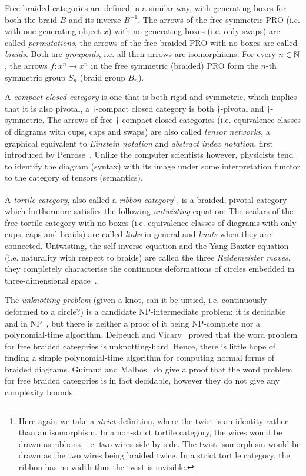 Free braided categories are defined in a similar way, with generating boxes for both the braid $B$ and its inverse $B^{-1}$.
The arrows of the free symmetric PRO (i.e. with one generating object $x$) with no generating boxes (i.e. only swaps) are called \emph{permutations}, the arrows of the free braided PRO with no boxes are called \emph{braids}.
Both are \emph{groupoids}, i.e. all their arrows are isomorphisms.
For every $n \in \mathbb{N}$, the arrows $f : x^n \to x^n$ in the free symmetric (braided) PRO form the $n$-th symmetric group $S_n$ (braid group $B_n$).

A \emph{compact closed category} is one that is both rigid and symmetric, which implies that it is also pivotal, a $\dagger$-compact closed category is both $\dagger$-pivotal and $\dagger$-symmetric.
The arrows of free $\dagger$-compact closed categories (i.e. equivalence classes of diagrams with cups, caps and swaps) are also called \emph{tensor networks}, a graphical equivalent to \emph{Einstein notation} and \emph{abstract index notation}, first introduced by Penrose~\cite{Penrose71}.
Unlike the computer scientists however, physicists tend to identify the diagram (syntax) with its image under some interpretation functor to the category of tensors (semantics).

A \emph{tortile category}, also called a \emph{ribbon category}\footnote
{Here again we take a \emph{strict} definition, where the twist is an identity rather than an isomorphism.
In a non-strict tortile category, the wires would be drawn as ribbons, i.e. two wires side by side.
The twist isomorphism would be drawn as the two wires being braided twice.
In a strict tortile category, the ribbon has no width thus the twist is invisible.},
is a braided, pivotal category which furthermore satisfies the following \emph{untwisting} equation:
The scalars of the free tortile category with no boxes (i.e. equivalence classes of diagrams with only cups, caps and braids) are called \emph{links} in general and \emph{knots} when they are connected.
Untwisting, the self-inverse equation and the Yang-Baxter equation (i.e. naturality with respect to braids) are called the three \emph{Reidemeister moves}, they completely characterise the continuous deformations of circles embedded in three-dimensional space~\cite{Reidemeister13}.

The \emph{unknotting problem} (given a knot, can it be untied, i.e. continuously deformed to a circle?) is a candidate NP-intermediate problem: it is decidable~\cite{Haken61} and in NP~\cite{Lackenby15}, but there is neither a proof of it being NP-complete nor a polynomial-time algorithm.
Delpeuch and Vicary~\cite{DelpeuchVicary21} proved that the word problem for free braided categories is unknotting-hard.
Hence, there is little hope of finding a simple polynomial-time algorithm for computing normal forms of braided diagrams.
Guiraud and Malbos~\cite{GuiraudMalbos12} do give a proof that the word problem for free braided categories is in fact decidable, however they do not give any complexity bounds.

